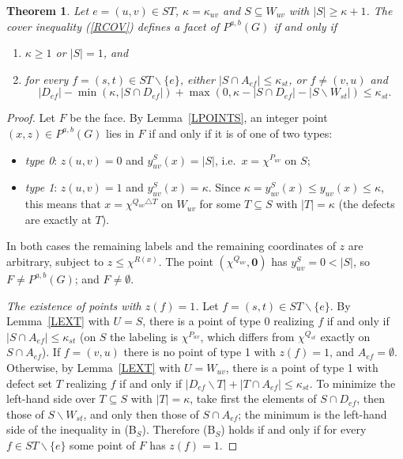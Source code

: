 \documentclass[a4paper,11pt]{article}
\newcommand{\ie}{{i.e.~}}
\newtheorem{thm}{Theorem}
\theoremstyle{definition}
\begin{document}
\begin{thm} \label{TCOV}
Let $e = (u,v) \in ST$, $\kappa = \kappa_{uv}$ and $S \subseteq W_{uv}$ with $|S| \geq \kappa + 1$. The cover inequality (\ref{RCOV})
defines a facet of $P^{a,b}(G)$ if and only if
\begin{enumerate}
\item[(A$_S$)] $\kappa \geq 1$ or $|S| = 1$, and
\item[(B$_S$)] for every $f = (s,t) \in ST \backslash \{e\}$, either $|S \cap A_{ef}| \leq \kappa_{st}$, or $f \neq (v,u)$ and
$$|D_{ef}| - \min(\kappa, |S \cap D_{ef}|) + \max(0, \kappa - |S \cap D_{ef}| - |S \backslash W_{st}|) \leq \kappa_{st}.$$
\end{enumerate}
\end{thm}
\begin{proof}
Let $F$ be the face. By Lemma~\ref{LPOINTS}, an integer point $(x,z) \in P^{a,b}(G)$ lies in $F$ if and only if it is of one of two types:
\begin{itemize}
\item \emph{type 0}: $z(u,v) = 0$ and $y^S_{uv}(x) = |S|$, \ie $x = \chi^{P_{uv}}$ on $S$;
\item \emph{type 1}: $z(u,v) = 1$ and $y^S_{uv}(x) = \kappa$. Since $\kappa = y^S_{uv}(x) \leq y_{uv}(x) \leq \kappa$, this means that
$x = \chi^{Q_{uv} \triangle T}$ on $W_{uv}$ for some $T \subseteq S$ with $|T| = \kappa$ (the defects are exactly at $T$).
\end{itemize}
In both cases the remaining labels and the remaining coordinates of $z$ are arbitrary, subject to $z \leq \chi^{R(x)}$. The point
$(\chi^{Q_{uv}}, \mathbf{0})$ has $y^S_{uv} = 0 < |S|$, so $F \neq P^{a,b}(G)$; and $F \neq \emptyset$.

\emph{The existence of points with $z(f) = 1$.} Let $f = (s,t) \in ST \backslash \{e\}$. By Lemma~\ref{LEXT} with $U = S$, there is a point
of type 0 realizing $f$ if and only if $|S \cap A_{ef}| \leq \kappa_{st}$ (on $S$ the labeling is $\chi^{P_{uv}}$, which differs from $\chi^{Q_{st}}$ exactly
on $S \cap A_{ef}$). If $f = (v,u)$ there is no point of type 1 with $z(f) = 1$, and $A_{ef} = \emptyset$. Otherwise, by Lemma~\ref{LEXT} with
$U = W_{uv}$, there is a point of type 1 with defect set $T$ realizing $f$ if and only if $|D_{ef} \backslash T| + |T \cap A_{ef}| \leq \kappa_{st}$.
To minimize the left-hand side over $T \subseteq S$ with $|T| = \kappa$, take first the elements of $S \cap D_{ef}$, then those of $S \backslash W_{st}$,
and only then those of $S \cap A_{ef}$; the minimum is the left-hand side of the inequality in (B$_S$). Therefore (B$_S$) holds if and only if
for every $f \in ST \backslash \{e\}$ some point of $F$ has $z(f) = 1$.


\end{proof}
\end{document}
